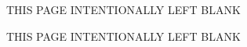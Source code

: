 \maketitle


\clearpage
   \hbox{}\par\vfill\centerline%
   {THIS PAGE INTENTIONALLY LEFT BLANK}%
   \vfill\newpage\fi
   \thispagestyle{plain}	%
   
\clearpage
\setcounter{savepage}{\thepage}
\begin{abstractpage}

\end{abstractpage}

% 

\clearpage
   \hbox{}\par\vfill\centerline%
   {THIS PAGE INTENTIONALLY LEFT BLANK}%
   \vfill\newpage\fi
   \thispagestyle{plain}	%
   
